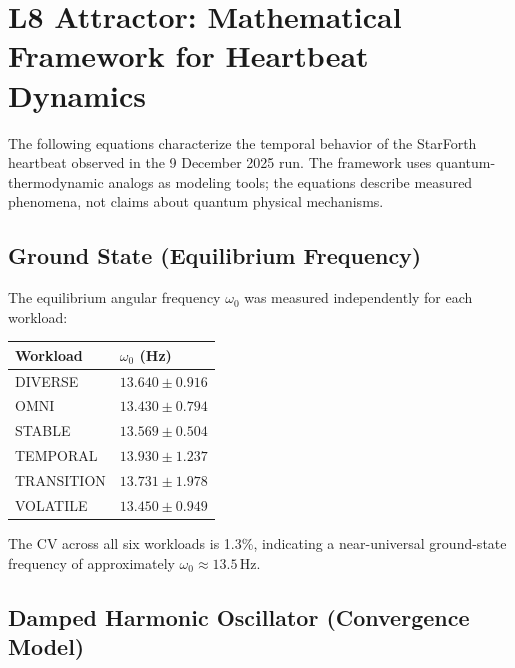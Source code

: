 
\section{L8 Attractor: Mathematical Framework for Heartbeat Dynamics}

The following equations characterize the temporal behavior of the StarForth
heartbeat observed in the 9 December 2025 run. The framework uses
quantum-thermodynamic analogs as modeling tools; the equations describe
measured phenomena, not claims about quantum physical mechanisms.

\subsection{Ground State (Equilibrium Frequency)}

The equilibrium angular frequency $\omega_0$ was measured independently
for each workload:

\begin{center}
\begin{tabular}{ll}
\toprule
Workload    & $\omega_0$ (Hz) \\
\midrule
DIVERSE     & $13.640 \pm 0.916$ \\
OMNI        & $13.430 \pm 0.794$ \\
STABLE      & $13.569 \pm 0.504$ \\
TEMPORAL    & $13.930 \pm 1.237$ \\
TRANSITION  & $13.731 \pm 1.978$ \\
VOLATILE    & $13.450 \pm 0.949$ \\
\bottomrule
\end{tabular}
\end{center}

The CV across all six workloads is 1.3\%, indicating a near-universal
ground-state frequency of approximately $\omega_0 \approx 13.5$\,Hz.

\subsection{Damped Harmonic Oscillator (Convergence Model)}

